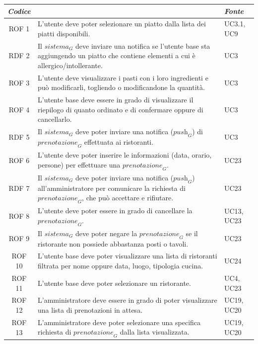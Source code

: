 \documentclass[12pt, oneside]{article}
\begin{document}
\begin{longtable}{|c|p{14cm}|p{2cm}|}
    \hline
    \emph{Codice} & \centering{\emph{Descrizione}} &  \emph{Fonte} \\
    \hline
    \endfirsthead
    \endhead

    ROF 1&  L'utente deve poter selezionare un piatto dalla lista dei piatti disponibili.  & UC3.1, UC9  \\
    \hline
    RDF 2& Il $\textit{sistema}_G$ deve inviare una notifica se l'utente base sta aggiungendo un piatto che contiene elementi a cui è allergico/intollerante. & UC3\\
    \hline
    ROF 3& L'utente deve visualizzare i pasti con i loro ingredienti e può modificarli, togliendo o modificandone la quantità. & UC3\\
    \hline
    ROF 4& L'utente base deve essere in grado di visualizzare il riepilogo di quanto ordinato e di confermare oppure di cancellarlo. & UC3 \\
    \hline
    RDF 5& Il $\textit{sistema}_G$ deve poter inviare una notifica ($\textit{push}_G$) di $\textit{prenotazione}_G$ effettuata ai ristoranti.& UC3 \\
    \hline
    ROF 6& L'utente deve poter inserire le informazioni (data, orario, persone) per effettuare una $\textit{prenotazione}_G$. & UC23\\
    \hline
    RDF 7& Il $\textit{sistema}_G$ deve poter inviare una notifica ($\textit{push}_G$) all'amministratore per comunicare la richiesta di $\textit{prenotazione}_G$, che può accettare e rifiutare. & UC23\\
    \hline
    ROF 8& L'utente deve poter essere in grado di cancellare la $\textit{prenotazione}_G$. & UC13, UC23 \\
    \hline
    ROF 9& Il $\textit{sistema}_G$ deve poter negare la $\textit{prenotazione}_G$ se il ristorante non possiede abbastanza posti o tavoli. & UC23 \\
    \hline
    ROF 10& L'utente base deve poter visualizzare una lista di ristoranti filtrata per nome oppure data, luogo, tipologia cucina. & UC24 \\
    \hline
    ROF 11& L'utente base deve poter selezionare un ristorante.  & UC4, UC23 \\
    \hline
    ROF 12& L'amministratore deve essere in grado di poter visualizzare una lista di prenotazioni in attesa. & UC19, UC20 \\
    \hline
    ROF 13& L'amministratore deve poter selezionare una specifica richiesta di $\textit{prenotazione}_G$ dalla lista visualizzata. & UC19, UC20 \\

\end{longtable}
\end{document}
